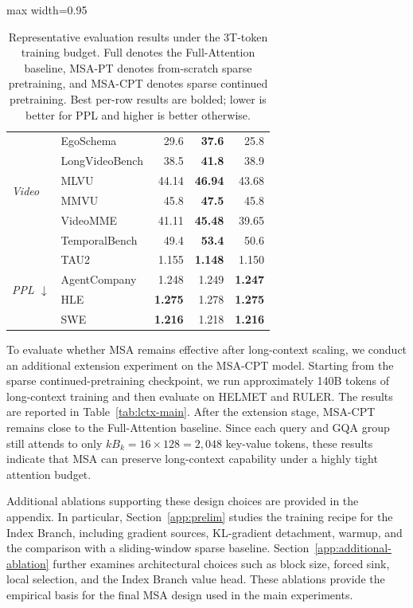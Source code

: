 \documentclass{llmxive}
\providecommand{\method}{\textsc{MSA}}
\providecommand{\Secref}[1]{Section~\ref{#1}}
\providecommand{\Tabref}[1]{Table~\ref{#1}}
\begin{document}
\begin{table}[!htbp]
{\begin{adjustbox}{max width=0.95\linewidth}
\begin{tabular}{llrrr}
\midrule
\multirow{6}{*}{\textit{Video}} & EgoSchema & 29.6 & \textbf{37.6} & 25.8 \\
 & LongVideoBench & 38.5 & \textbf{41.8} & 38.9 \\
 & MLVU & 44.14 & \textbf{46.94} & 43.68 \\
 & MMVU & 45.8 & \textbf{47.5} & 45.8 \\
 & VideoMME & 41.11 & \textbf{45.48} & 39.65 \\
 & TemporalBench & 49.4 & \textbf{53.4} & 50.6 \\
\midrule
\multirow{4}{*}{\textit{PPL $\downarrow$}} & TAU2 & 1.155 & \textbf{1.148} & 1.150 \\
 & AgentCompany & 1.248 & 1.249 & \textbf{1.247} \\
 & HLE & \textbf{1.275} & 1.278 & \textbf{1.275} \\
 & SWE & \textbf{1.216} & 1.218 & \textbf{1.216} \\
\bottomrule
\end{tabular}
\end{adjustbox}
}
\caption{Representative evaluation results under the 3T-token training budget. Full denotes the Full-Attention baseline, \method{}-PT denotes from-scratch sparse pretraining, and \method{}-CPT denotes sparse continued pretraining. Best per-row results are bolded; lower is better for PPL and higher is better otherwise.}
\label{tab:pretrain-representative}
\end{table}


To evaluate whether \method{} remains effective after long-context scaling, we conduct an additional extension experiment on the \method{}-CPT model. Starting from the sparse continued-pretraining checkpoint, we run approximately 140B tokens of long-context training and then evaluate on HELMET and RULER. The results are reported in \Tabref{tab:lctx-main}. After the extension stage, \method{}-CPT remains close to the Full-Attention baseline. Since each query and GQA group still attends to only \(k B_k=16\times128=2{,}048\) key-value tokens, these results indicate that \method{} can preserve long-context capability under a highly tight attention budget.

Additional ablations supporting these design choices are provided in the appendix. In particular, \Secref{app:prelim} studies the training recipe for the Index Branch, including gradient sources, KL-gradient detachment, warmup, and the comparison with a sliding-window sparse baseline. \Secref{app:additional-ablation} further examines architectural choices such as block size, forced sink, local selection, and the Index Branch value head. These ablations provide the empirical basis for the final \method{} design used in the main experiments.
\end{document}
